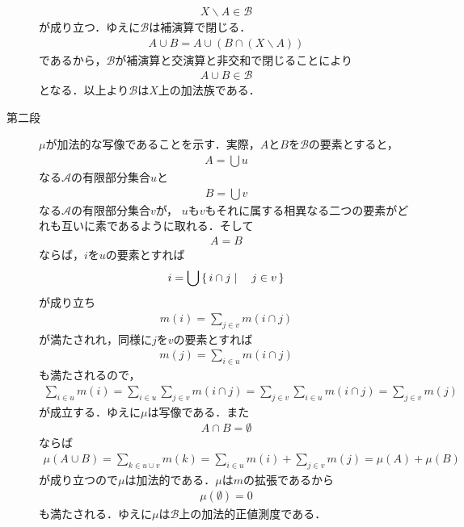 \begin{prf}
\begin{description}
					\begin{align}
						X \backslash A \in \mathscr{B}
					\end{align}
					が成り立つ．ゆえに$\mathscr{B}$は補演算で閉じる．
					\begin{align}
						A \cup B = A \cup (B \cap (X \backslash A))
					\end{align}
					であるから，$\mathscr{B}$が補演算と交演算と非交和で閉じることにより
					\begin{align}
						A \cup B \in \mathscr{B}
					\end{align}
					となる．以上より$\mathscr{B}$は$X$上の加法族である．
					
				\item[第二段]
					$\mu$が加法的な写像であることを示す．実際，$A$と$B$を$\mathscr{B}$の要素とすると，
					\begin{align}
						A = \bigcup u
					\end{align}
					なる$\mathscr{A}$の有限部分集合$u$と
					\begin{align}
						B = \bigcup v
					\end{align}
					なる$\mathscr{A}$の有限部分集合$v$が，
					$u$も$v$もそれに属する相異なる二つの要素がどれも互いに素であるように取れる．そして
					\begin{align}
						A = B
					\end{align}
					ならば，$i$を$u$の要素とすれば
					\begin{align}
						i = \bigcup \left\{\, i \cap j \mid \quad j \in v\, \right\}
					\end{align}
					が成り立ち
					\begin{align}
						m(i) = \sum_{j \in v} m(i \cap j)
					\end{align}
					が満たされれ，同様に$j$を$v$の要素とすれば
					\begin{align}
						m(j) = \sum_{i \in u} m(i \cap j)
					\end{align}
					も満たされるので，
					\begin{align}
						\sum_{i \in u} m(i) = \sum_{i \in u} \sum_{j \in v} m(i \cap j)
						= \sum_{j \in v} \sum_{i \in u} m(i \cap j)
						= \sum_{j \in v} m(j)
					\end{align}
					が成立する．ゆえに$\mu$は写像である．また
					\begin{align}
						A \cap B = \emptyset
					\end{align}
					ならば
					\begin{align}
						\mu(A \cup B)
						=  \sum_{k \in u \cup v} m(k)
						= \sum_{i \in u} m(i) + \sum_{j \in v} m(j)
						= \mu(A) + \mu(B)
					\end{align}
					が成り立つので$\mu$は加法的である．$\mu$は$m$の拡張であるから
					\begin{align}
						\mu(\emptyset) = 0
					\end{align}
					も満たされる．ゆえに$\mu$は$\mathscr{B}$上の加法的正値測度である．
					\QED
			\end{description}
		\end{prf}
		

